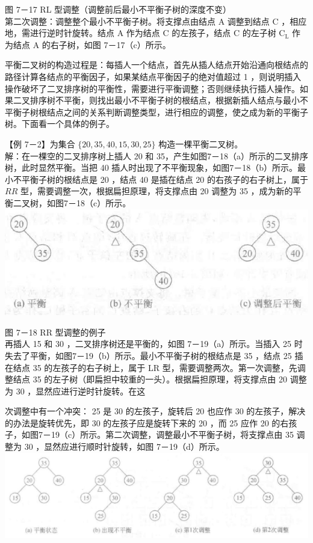 \documentclass[10pt]{article}
\begin{document}
图 7－17 RL 型调整（调整前后最小不平衡子树的深度不变）\\
第二次调整：调整整个最小不平衡子树。将支撑点由结点 A 调整到结点 C ，相应地，需进行逆时针旋转。结点 A 作为结点 C 的左孩子，结点 C 的左子树 $\mathrm{C}_{\mathrm{L}}$ 作为结点 A 的右子树，如图 7－17（c）所示。

平衡二叉树的构造过程是：每插人一个结点，首先从插人结点开始沿通向根结点的路径计算各结点的平衡因子，如果某结点平衡因子的绝对值超过 1 ，则说明插入操作破坏了二叉排序树的平衡性，需要进行平衡调整；否则继续执行插人操作。如果二叉排序树不平衡，则找出最小不平衡子树的根结点，根据新插人结点与最小不平衡子树根结点之间的关系判断调整类型，进行相应的调整，使之成为新的平衡子树。下面看一个具体的例子。

【例 7－2】为集合 $\{20,35,40,15,30,25\}$ 构造一棵平衡二叉树。\\
解：在一棵空的二叉排序树上插人 20 和 35，产生如图7－18（a）所示的二叉排序树，此时显然平衡。当把 40 插人时出现了不平衡现象，如图7－18（b）所示。最小不平衡子树的根结点是 20 ，结点 40 是插在结点 20 的右孩子的右子树上，属于 $R R$ 型，需要调整一次，根据扁担原理，将支撑点由 20 调整为 35 ，成为新的平衡二叉树，如图7－18（c）所示。\\
\includegraphics[max width=\textwidth, center]{2025_06_06_704745ea57b15b2333e5g-247}

图 7－18 RR 型调整的例子\\
再插人 15 和 30 ，二叉排序树还是平衡的，如图 7－19（a）所示。当插入 25 时失去了平衡，如图7－19（b）所示。最小不平衡子树的根结点是 35 ，结点 25 插在结点 35 的左孩子的右子树上，属于 LR 型，需要调整两次。第一次调整，先调整结点 35 的左子树（即扁担中较重的一头）。根据扁担原理，将支撑点由 20 调整为 30 ，显然应进行逆时针旋转。在这

次调整中有一个冲突： 25 是 30 的左孩子，旋转后 20 也应作 30 的左孩子，解决的办法是旋转优先，即 30 的左孩子应是旋转下来的 20 ，而 25 应作 20 的右孩子，如图7－19（c）所示。第二次调整，调整最小不平衡子树，将支撑点由 35 调整为 30 ，显然应进行顺时针旋转，如图 7－19（d）所示。\\
\includegraphics[max width=\textwidth, center]{2025_06_06_704745ea57b15b2333e5g-248(1)}
\end{document}
